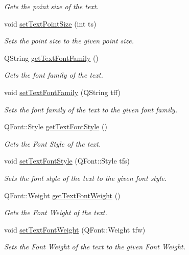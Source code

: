 \begin{DoxyCompactItemize}
\begin{DoxyCompactList}\small\item\em Gets the point size of the text. \end{DoxyCompactList}\item 
void \hyperlink{classText_ad1e9aabbb6fc0aebc94b3855e32eea78}{set\+Text\+Point\+Size} (int ts)
\begin{DoxyCompactList}\small\item\em Sets the point size to the given point size. \end{DoxyCompactList}\item 
Q\+String \hyperlink{classText_ac72f905a25316d1c271674811e31f724}{get\+Text\+Font\+Family} ()
\begin{DoxyCompactList}\small\item\em Gets the font family of the text. \end{DoxyCompactList}\item 
void \hyperlink{classText_addb9d731d7822aa2d5956d9dc0201500}{set\+Text\+Font\+Family} (Q\+String tff)
\begin{DoxyCompactList}\small\item\em Sets the font family of the text to the given font family. \end{DoxyCompactList}\item 
Q\+Font\+::\+Style \hyperlink{classText_ad572034a19f008c64c63e858cf02a0a4}{get\+Text\+Font\+Style} ()
\begin{DoxyCompactList}\small\item\em Gets the Font Style of the text. \end{DoxyCompactList}\item 
void \hyperlink{classText_acd45f77b52ddeeeeec895fb06997784f}{set\+Text\+Font\+Style} (Q\+Font\+::\+Style tfs)
\begin{DoxyCompactList}\small\item\em Sets the font style of the text to the given font style. \end{DoxyCompactList}\item 
Q\+Font\+::\+Weight \hyperlink{classText_a633a61b274b66c47244430638cd57233}{get\+Text\+Font\+Weight} ()
\begin{DoxyCompactList}\small\item\em Gets the Font Weight of the text. \end{DoxyCompactList}\item 
void \hyperlink{classText_afc544d4b1e989b7386026c39f9413228}{set\+Text\+Font\+Weight} (Q\+Font\+::\+Weight tfw)
\begin{DoxyCompactList}\small\item\em Sets the Font Weight of the text to the given Font Weight. \end{DoxyCompactList}\item 

\end{DoxyCompactItemize}
